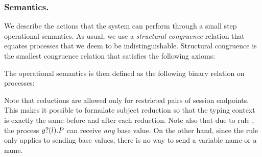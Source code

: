 \subsubsection{Semantics.}
We describe the actions that the system can perform through a small step operational semantics.
As usual, we use  a \emph{structural congruence} relation that equates processes that we deem to be indistinguishable. Structural congruence is the smallest congruence relation that satisfies the following axioms:

The operational semantics is then defined as the following binary relation on processes:

Note that reductions are allowed only for restricted pairs of session endpoints. This makes it possible to formulate subject reduction so that the typing context is exactly the same before and after each reduction.
%
Note also that due to rule , the process \( y ? (l) . P \) can receive \emph{any} base value.
On the other hand, since the rule  only applies to sending base values, there is no way to send a variable name or a name.

